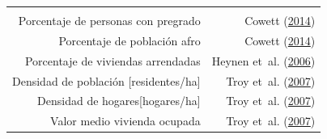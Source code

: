 \documentclass[12pt,a4paper,openany]{book}
\theoremstyle{definition}
\theoremstyle{definition}
\theoremstyle{definition}
\theoremstyle{remark}
\begin{document}
\begin{longtable}[]{@{}rr@{}}
\begin{minipage}[t]{0.31\columnwidth}
\end{minipage}\tabularnewline
\begin{minipage}[t]{0.57\columnwidth}\raggedleft\strut
Porcentaje de personas con pregrado\strut
\end{minipage} & \begin{minipage}[t]{0.31\columnwidth}\raggedleft\strut
Cowett (\protect\hyperlink{ref-cowett_methodology_2014}{2014})\strut
\end{minipage}\tabularnewline
\begin{minipage}[t]{0.57\columnwidth}\raggedleft\strut
Porcentaje de población afro\strut
\end{minipage} & \begin{minipage}[t]{0.31\columnwidth}\raggedleft\strut
Cowett (\protect\hyperlink{ref-cowett_methodology_2014}{2014})\strut
\end{minipage}\tabularnewline
\begin{minipage}[t]{0.57\columnwidth}\raggedleft\strut
Porcentaje de viviendas arrendadas\strut
\end{minipage} & \begin{minipage}[t]{0.31\columnwidth}\raggedleft\strut
Heynen et~al.
(\protect\hyperlink{ref-heynen_political_2006}{2006})\strut
\end{minipage}\tabularnewline
\begin{minipage}[t]{0.57\columnwidth}\raggedleft\strut
Densidad de población {[}residentes/ha{]}\strut
\end{minipage} & \begin{minipage}[t]{0.31\columnwidth}\raggedleft\strut
Troy et~al. (\protect\hyperlink{ref-troy_predicting_2007}{2007})\strut
\end{minipage}\tabularnewline
\begin{minipage}[t]{0.57\columnwidth}\raggedleft\strut
Densidad de hogares{[}hogares/ha{]}\strut
\end{minipage} & \begin{minipage}[t]{0.31\columnwidth}\raggedleft\strut
Troy et~al. (\protect\hyperlink{ref-troy_predicting_2007}{2007})\strut
\end{minipage}\tabularnewline
\begin{minipage}[t]{0.57\columnwidth}\raggedleft\strut
Valor medio vivienda ocupada\strut
\end{minipage} & \begin{minipage}[t]{0.31\columnwidth}\raggedleft\strut
Troy et~al. (\protect\hyperlink{ref-troy_predicting_2007}{2007})\strut
\end{minipage}\tabularnewline

\end{longtable}
\end{document}
